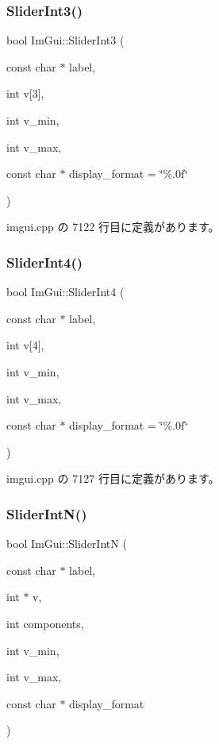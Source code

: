 \subsubsection{\texorpdfstring{Slider\+Int3()}{SliderInt3()}}
{\footnotesize\ttfamily bool Im\+Gui\+::\+Slider\+Int3 (\begin{DoxyParamCaption}\item[{const char $\ast$}]{label,  }\item[{int}]{v\mbox{[}3\mbox{]},  }\item[{int}]{v\+\_\+min,  }\item[{int}]{v\+\_\+max,  }\item[{const char $\ast$}]{display\+\_\+format = {\ttfamily \char`\"{}\%.0f\char`\"{}} }\end{DoxyParamCaption})}



 imgui.\+cpp の 7122 行目に定義があります。

\mbox{\label{namespace_im_gui_a88c24aa0e5af4cbb14559b5789886810}} 
\subsubsection{\texorpdfstring{Slider\+Int4()}{SliderInt4()}}
{\footnotesize\ttfamily bool Im\+Gui\+::\+Slider\+Int4 (\begin{DoxyParamCaption}\item[{const char $\ast$}]{label,  }\item[{int}]{v\mbox{[}4\mbox{]},  }\item[{int}]{v\+\_\+min,  }\item[{int}]{v\+\_\+max,  }\item[{const char $\ast$}]{display\+\_\+format = {\ttfamily \char`\"{}\%.0f\char`\"{}} }\end{DoxyParamCaption})}



 imgui.\+cpp の 7127 行目に定義があります。

\mbox{\label{namespace_im_gui_a13fe35db80c7d1002c98fd5e8ea90239}} 
\subsubsection{\texorpdfstring{Slider\+Int\+N()}{SliderIntN()}}
{\footnotesize\ttfamily bool Im\+Gui\+::\+Slider\+IntN (\begin{DoxyParamCaption}\item[{const char $\ast$}]{label,  }\item[{int $\ast$}]{v,  }\item[{int}]{components,  }\item[{int}]{v\+\_\+min,  }\item[{int}]{v\+\_\+max,  }\item[{const char $\ast$}]{display\+\_\+format }\end{DoxyParamCaption})}



